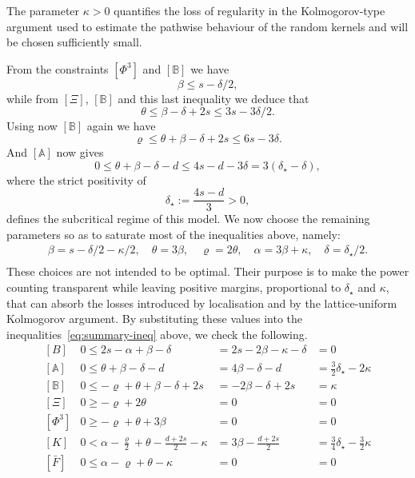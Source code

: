 \documentclass{article}
\numberwithin{equation}{section}
\newcommand{\assign}{:=}
\theoremstyle{plain}
\theoremstyle{definition}
\begin{document}
The parameter $\kappa > 0$ quantifies the loss of regularity in the
Kolmogorov-type argument used to estimate the pathwise behaviour of the random
kernels and will be chosen sufficiently small.

From the constraints $[\Phi^3]$ and $[\mathbb{B}]$ we have
\[ \beta \leqslant s - \delta / 2, \]
while from $[\Xi]$, $[\mathbb{B}]$ and this last inequality we deduce that
\[ \theta \leqslant \beta - \delta + 2 s \leqslant 3 s - 3 \delta / 2. \]
Using now $[\mathbb{B}]$ again we have
\[ \varrho \leqslant \theta + \beta - \delta + 2 s \leqslant 6 s - 3 \delta .
\]
And $[\mathbb{A}]$ now gives
\begin{equation}
  0 \leqslant \theta + \beta - \delta - d \leqslant 4 s - d - 3 \delta = 3
  (\delta_{\star} - \delta), \label{eq:sub-crit}
\end{equation}
where the strict positivity of
\[ \delta_{\star} \assign \frac{4 s - d}{3} > 0, \]
defines the subcritical regime of this model. We now choose the remaining
parameters so as to saturate most of the inequalities above, namely:
\begin{equation}
  \begin{aligned}
    \beta = s - \delta / 2 - \kappa / 2, \quad \theta = 3 \beta, \quad \varrho
    = 2 \theta, \quad \alpha = 3 \beta + \kappa, \quad \delta
    = \delta_{\star} / 2 .\\
  \end{aligned} \label{eq:values-param}
\end{equation}
These choices are not intended to be optimal. Their purpose is to make the
power counting transparent while leaving positive margins, proportional to
$\delta_{\star}$ and $\kappa$, that can absorb the losses introduced by
localisation and by the lattice-uniform Kolmogorov argument.
By substituting these values into the inequalities~\eqref{eq:summary-ineq}
above, we check the following.
\begin{equation}
  \begin{array}{llll}
    {}[B] & 0 \leqslant 2 s - \alpha + \beta - \delta & = 2 s - 2 \beta -
    \kappa - \delta & = 0\\
    {}[\mathbb{A}] & 0 \leqslant \theta + \beta - \delta - d & = 4 \beta -
    \delta - d & = \frac{3}{2} \delta_{\star} - 2 \kappa\\
    {}[\mathbb{B}] & 0 \leqslant - \varrho + \theta + \beta - \delta + 2 s & =
    - 2 \beta - \delta + 2 s & = \kappa\\
    {}[\Xi] & 0 \geqslant - \varrho + 2 \theta & = 0 & = 0\\
    {}[\Phi^3] & 0 \geqslant - \varrho + \theta + 3 \beta & = 0 & = 0\\
    {}[K] & 0 < \alpha - \frac{\varrho}{2} + \theta - \frac{d + 2 s}{2} -
    \kappa & = 3 \beta - \frac{d + 2 s}{2} & = \frac{3}{4}
    \delta_{\star} - \frac{3}{2} \kappa\\
    {}[\bar{F}] & 0 \leqslant \alpha - \varrho + \theta - \kappa & = 0 & = 0
  \end{array} \label{eq:ver-param}
\end{equation}
\end{document}
